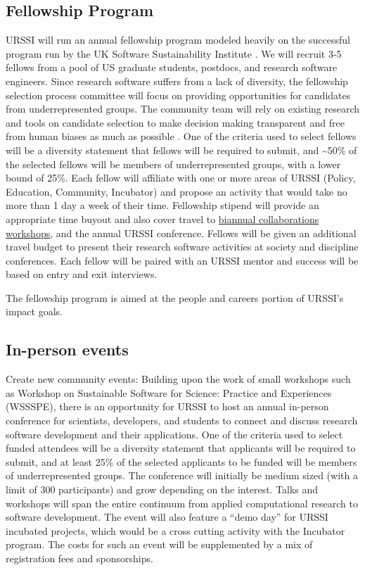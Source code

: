 \documentclass[
]{book}
\begin{document}
\hypertarget{fellowship-program}{%
\subsection{Fellowship Program}\label{fellowship-program}}

URSSI will run an annual fellowship program modeled heavily on the successful program run by the UK Software Sustainability Institute \citep{10.12688/f1000research.16231.1}. We will recruit 3-5 fellows from a pool of US graduate students, postdocs, and research software engineers.
Since research software suffers from a lack of diversity, the fellowship selection process committee will focus on providing opportunities for candidates from underrepresented groups. The community team will rely on existing research and tools on candidate selection to make decision making transparent and free from human biases as much as possible \citep{10.1371/journal.pone.0231939}.
One of the criteria used to select fellows will be a diversity statement that fellows will be required to submit, and \textasciitilde50\% of the selected fellows will be members of underrepresented groups, with a lower bound of 25\%.
Each fellow will affiliate with one or more areas of URSSI (Policy, Education, Community, Incubator) and propose an activity that would take no more than 1 day a week of their time. Fellowship stipend will provide an appropriate time buyout and also cover travel to \href{https://eng.ox.ac.uk/events/ssi-collaborations-workshop-2020/}{biannual collaborations workshops}, and the annual URSSI conference. Fellows will be given an additional travel budget to present their research software activities at society and discipline conferences. Each fellow will be paired with an URSSI mentor and success will be based on entry and exit interviews.

The fellowship program is aimed at the people and careers portion of URSSI's impact goals.

\hypertarget{in-person-events}{%
\subsection{In-person events}\label{in-person-events}}

Create new community events:
Building upon the work of small workshops such as Workshop on Sustainable Software for Science: Practice and Experiences (WSSSPE), there is an opportunity for URSSI to host an annual in-person conference for scientists, developers, and students to connect and discuss research software development and their applications.
One of the criteria used to select funded attendees will be a diversity statement that applicants will be required to submit, and at least 25\% of the selected applicants to be funded will be members of underrepresented groups.
The conference will initially be medium sized (with a limit of 300 participants) and grow depending on the interest.
Talks and workshops will span the entire continuum from applied computational research to software development.
The event will also feature a ``demo day'' for URSSI incubated projects, which would be a cross cutting activity with the Incubator program.
The costs for such an event will be supplemented by a mix of registration fees and sponsorships.
\end{document}
